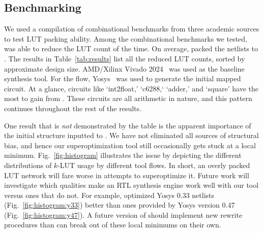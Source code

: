 \subsection{Benchmarking}\label{sec:results:benchmark}

We used a compilation of \nbenchmarks{} combinational benchmarks from three
academic sources to test LUT packing ability. Among the combinational
benchmarks we tested, \shortname{} was able to reduce the LUT count \fmetric{}
of the time. On average, \shortname{} packed the netlists to \metric{}. The
results in Table~\ref{tab:results} list all the reduced LUT counts, sorted by
approximate design size. AMD/Xilinx Vivado 2024~\cite{vivado} was used as the
baseline synthesis tool. For the \shortname{} flow, Yosys~\cite{yosys} was used
to generate the initial mapped circuit. At a glance, circuits like `int2float,'
`c6288,` `adder,' and `square' have the most to gain from \shortname{}. These
circuits are all arithmetic in nature, and this pattern continues throughout
the rest of the results.

One result that is \textit{not} demonstrated by the table is the apparent
importance of the initial structure inputted to \shortname{}. We have not
eliminated all sources of structural bias, and hence our superoptimization tool
still occasionally gets stuck at a local minimum. Fig.~\ref{fig:histogram}
illustrates the issue by depicting the different distributions of $k$-LUT usage
by different tool flows. In short, an overly packed LUT network will fare worse
in attempts to superoptimize it. Future work will investigate which qualities
make an RTL synthesis engine work well with our tool versus ones that do not.
For example, \shortname{} optimized Yosys 0.33 netlists
(Fig.~\ref{fig:histogram:y33}) better than ones provided by Yosys version 0.47
(Fig.~\ref{fig:histogram:y47}). A future version of \shortname{} should
implement new rewrite procedures than can break out of these local minimums on
their own.

